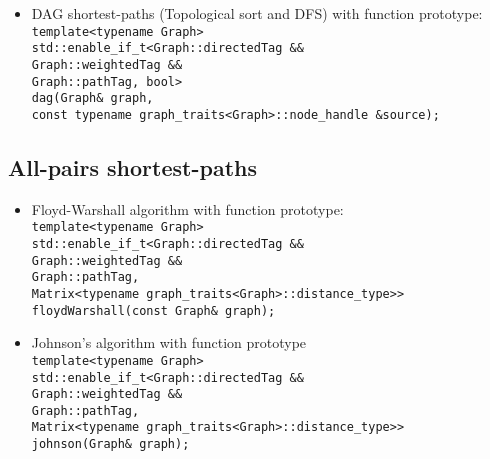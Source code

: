 \documentclass{article}
\begin{document}
\begin{itemize}
	\item DAG shortest-paths (Topological sort and DFS) with function prototype:\\
		\texttt{template<typename Graph>\\
			std::enable\_if\_t<Graph::directedTag \&\&\\\hspace*{7.67em}
			Graph::weightedTag \&\&\\\hspace*{7.67em}
			Graph::pathTag, bool>\\
		dag(Graph\& graph, \\\hspace*{1.5em}
			const typename graph\_traits<Graph>::node\_handle \&source);}
\end{itemize}

\subsection*{All-pairs shortest-paths}
\begin{itemize}
	\item Floyd-Warshall algorithm with function prototype:\\
		\texttt{template<typename Graph>\\
			std::enable\_if\_t<Graph::directedTag \&\&\\\hspace*{7.67em}
			Graph::weightedTag \&\&\\\hspace*{7.67em}
			Graph::pathTag,\\\hspace*{7.67em}
			Matrix<typename graph\_traits<Graph>::distance\_type>>\\
		floydWarshall(const Graph\& graph);}
	\item Johnson's algorithm with function prototype\\
		\texttt{template<typename Graph>\\
			std::enable\_if\_t<Graph::directedTag \&\&\\\hspace*{7.67em}
			Graph::weightedTag \&\&\\\hspace*{7.67em}
			Graph::pathTag,\\\hspace*{7.67em}
			Matrix<typename graph\_traits<Graph>::distance\_type>>\\
		johnson(Graph\& graph);}
\end{itemize}
\end{document}
